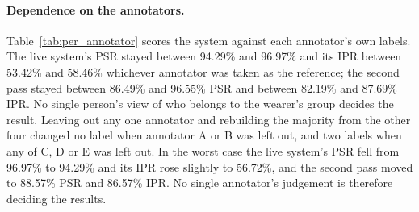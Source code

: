 \paragraph{Dependence on the annotators.}
Table~\ref{tab:per_annotator} scores the system against each annotator's own labels. The
live system's PSR stayed between 94.29\% and 96.97\% and its IPR between 53.42\% and
58.46\% whichever annotator was taken as the reference; the second pass stayed between
86.49\% and 96.55\% PSR and between 82.19\% and 87.69\% IPR. No single person's view of who
belongs to the wearer's group decides the result. Leaving out any one annotator and
rebuilding the majority from the other four changed no label when annotator A or B was left
out, and two labels when any of C, D or E was left out. In the worst case the
live system's PSR fell from 96.97\% to 94.29\% and its IPR rose slightly to 56.72\%, and the
second pass moved to 88.57\% PSR and 86.57\% IPR. No single annotator's judgement is
therefore deciding the results.

\begin{table}[htbp]
\begin{singlespace}
\centering
\caption{The system scored against each annotator's labels on their own, with Cohen's
$\kappa$ between the system and that annotator. Annotator D left one clip unlabelled.}
\label{tab:per_annotator}
\renewcommand{\arraystretch}{1.3}
\end{singlespace}
\end{table}

